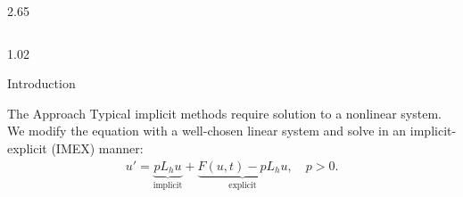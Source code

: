 \documentclass[]{beamer} %
\newlength{\onecolwid}
\newcommand{\abs}[1]{\left\vert #1 \right\vert}
\DeclareMathOperator{\Div}{div}
\begin{document}
\begin{frame}[t]
\begin{columns}[t]
\begin{column}{2.65\onecolwid}
\begin{columns}[t,totalwidth=2.55\onecolwid]
\begin{column}{1.02\onecolwid}
\begin{block}{Introduction}
						\end{block}
						
						\begin{block}{The Approach} %
							Typical implicit methods require solution to a nonlinear system. We modify the equation with a well-chosen linear system and solve in an implicit-explicit (IMEX) manner: 
							\begin{align}
							u' = \underbrace{pL_h u}_{\textrm{implicit}} + \underbrace{F(u,t) - pL_h u}_{\textrm{explicit}},
							\quad p>0.
							\end{align}
							

\end{block}
\end{column}
\end{columns}
\end{column}
\end{columns}
\end{frame}
\end{document}
